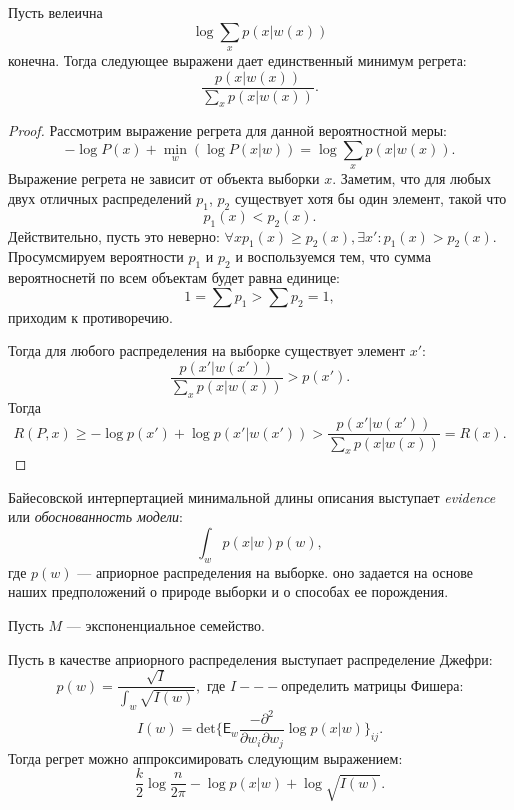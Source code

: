 \documentclass[../main.tex]{subfiles}
\begin{document}
\begin{theorem}
Пусть велеична
\[
    \log \sum_{x} p(x|w(x))
\]
конечна.  Тогда следующее выражени дает единственный минимум регрета:
\[
    \frac{p(x|w(x))}{\sum_{x}p(x|w(x)) }.
\]
\end{theorem}
\begin{proof}
Рассмотрим выражение регрета для данной вероятностной меры:
\[
    - \log P(x) + \min_{w} (\log P(x|w))  = \log \sum_{x} p(x|w(x)).
\]
Выражение регрета не зависит от объекта выборки $x$. 
Заметим, что для любых двух отличных распределений  $p_1$, $p_2$ существует хотя бы один элемент, такой что 
\[
    p_1(x) < p_2(x).
\]
Действительно, пусть это неверно: $\forall x p_1(x) \geq p_2(x), \exists x': p_1(x) > p_2(x)$. Просумсмируем вероятности $p_1$ и $p_2$ и воспользуемся тем, что сумма вероятноснетй по всем объектам будет равна единице:
\[
   1 =  \sum p_1  > \sum p_2 = 1,
\]
приходим к противоречию.

Тогда для любого распределения на выборке существует элемент $x'$:
\[
    \frac{p(x'|w(x'))}{\sum_{x}p(x|w(x)) } > p(x').
\]
Тогда 
\[
R(P, x)  \geq -\log p(x') + \log p(x'|w(x')) > \frac{p(x'|w(x'))}{\sum_{x}p(x|w(x)) } = R(x).
\]

\end{proof}

Байесовской интерпертацией минимальной длины описания выступает \textit{evidence} или \textit{обоснованность модели}:
\[
    \int_{w} p(x|w) p(w), 
\]
где $p(w)$ --- априорное распределения на выборке. оно задается на основе наших предположений о природе выборки и о способах ее порождения.

\begin{theorem}
Пусть $M$ --- экспоненциальное семейство. 

Пусть в качестве априорного распределения выступает распределение Джефри:
\[
    p(w) = \frac{\sqrt{I}}{\int_w \sqrt{I(w)}}, \text{ где } I --- \text{определить матрицы Фишера:}    
\]
\[
    I(w) = \text{det}\{\mathsf{E}_w \frac{-\partial^2}{\partial w_i \partial w_j } \log p(x|w) \}_{ij}.
\]
Тогда регрет можно аппроксимировать следующим выражением:
\[
\frac{k}{2}\log{\frac{n}{2\pi}} - \log p(x|w) + \log \sqrt{I(w)}.
\]

\end{theorem}
\end{document}
